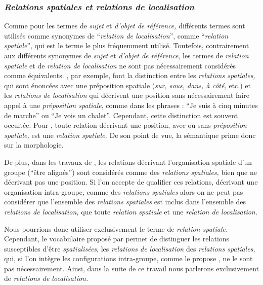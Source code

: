 
\subsubsection{\emph{Relations spatiales et relations de localisation}}

Comme pour les termes de \emph{sujet} et \emph{d'objet de référence,}
différents termes sont utilisés comme synonymes de
\enquote{\emph{relation de localisation}}, comme
\enquote{\emph{relation spatiale}}, qui est le terme le plus
fréquemment utilisé. Toutefois, contrairement aux différents synonymes
de \emph{sujet} et \emph{d'objet de référence}, les termes de
\emph{relation spatiale} et de \emph{relation de localisation} ne sont
pas nécessairement considérés comme
équivalents. \textcite{Duchene2019}, par exemple, font la distinction
entre les \emph{relations spatiales,} qui sont énoncées avec une
préposition spatiale (\eg \emph{sur, sous, dans, à côté,} etc.) et les
\emph{relations de localisation} qui décrivent une position sans
nécessairement faire appel à une \emph{préposition spatiale}, comme
dans les phrases : \enquote{Je suis à cinq minutes de marche} ou
\enquote{Je vois un chalet}. Cependant, cette distinction est souvent
occultée. Pour \textcite{Vandeloise1986}, toute relation décrivant une
position, avec ou sans \emph{préposition spatiale,} est une
\emph{relation spatiale.} De son point de vue, la sémantique prime
donc sur la morphologie.

De plus, dans les travaux de \textcite{Bateman2010}, les relations
décrivant l'organisation spatiale d'un groupe (\eg \enquote{être
  alignés}) sont considérés comme des \emph{relations spatiales,} bien
que ne décrivant pas une position. Si l'on accepte de qualifier ces
relations, décrivant une organisation intra-groupe, comme des
\emph{relations spatiales} alors on ne peut pas considérer que
l'ensemble des \emph{relations spatiales} est inclus dans l'ensemble
des \emph{relations de localisation,} \ie que toute \emph{relation
  spatiale} et une \emph{relation de localisation.}

Nous pourrions donc utiliser exclusivement le terme de \emph{relation
  spatiale.} Cependant, le vocabulaire proposé par
\textcite{Duchene2019} permet de distinguer les relations susceptibles
d'être \emph{spatialisées}, \ie les \emph{relations de localisation}
des \emph{relations spatiales,} qui, si l'on intègre les
configurations intra-groupe, comme le propose \textcite{Bateman2010},
ne le sont pas nécessairement. Ainsi, dans la suite de ce travail nous
parlerons exclusivement de \emph{relations de localisation.}

